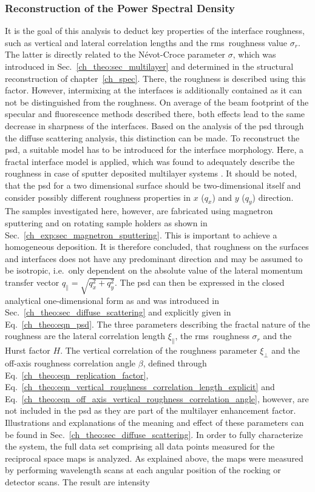\subsubsection{Reconstruction of the Power Spectral Density}
It is the goal of this analysis to deduct key properties of the interface roughness, such as vertical and lateral correlation lengths and the \gls{rms}~roughness value $\sigma_r$. The latter is directly related to the N\'{e}vot-Croce parameter $\sigma$, which was introduced in Sec.~\ref{ch_theo:sec_multilayer} and determined in the structural reconstruction of chapter~\ref{ch_spec}. There, the roughness is described using this factor. However, intermixing at the interfaces is additionally contained as it can not be distinguished from the roughness. On average of the beam footprint of the specular and fluorescence methods described there, both effects lead to the same decrease in sharpness of the interfaces. Based on the analysis of the \gls{psd} through the diffuse scattering analysis, this distinction can be made. To reconstruct the \gls{psd}, a suitable model has to be introduced for the interface morphology. Here, a fractal interface model is applied, which was found to adequately describe the roughness in case of sputter deposited multilayer systems \cite{de_boer_x-ray_1995, de_boer_x-ray_1996, sinha_x-ray_1988}. It should be noted, that the \gls{psd} for a two dimensional surface should be two-dimensional itself and consider possibly different roughness properties in $x$ ($q_x$) and $y$ ($q_y$) direction. The samples investigated here, however, are fabricated using magnetron sputtering and on rotating sample holders as shown in Sec.~\ref{ch_exp:sec_magnetron_sputtering}. This is important to achieve a homogeneous deposition. It is therefore concluded, that roughness on the surfaces and interfaces does not have any predominant direction and may be assumed to be isotropic, i.e.~only dependent on the absolute value of the lateral momentum transfer vector $q_\parallel = \sqrt{q_x^2+q_y^2}$. The \gls{psd} can then be expressed in the closed analytical one-dimensional form as and was introduced in Sec.~\ref{ch_theo:sec_diffuse_scattering} and explicitly given in Eq.~\eqref{ch_theo:eqn_psd}. The three parameters describing the fractal nature of the roughness are the lateral correlation length $\xi_\parallel$, the \gls{rms}~roughness $\sigma_r$ and the Hurst factor $H$. The vertical correlation of the roughness parameter $\xi_\perp$ and the off-axis roughness correlation angle $\beta$, defined through Eq.~\eqref{ch_theo:eqn_replication_factor}, Eq.~\eqref{ch_theo:eqn_vertical_roughness_correlation_length_explicit} and Eq.~\eqref{ch_theo:eqn_off_axis_vertical_roughness_correlation_angle}, however, are not included in the \gls{psd} as they are part of the multilayer enhancement factor. Illustrations and explanations of the meaning and effect of these parameters can be found in Sec.~\ref{ch_theo:sec_diffuse_scattering}. In order to fully characterize the system, the full data set comprising all data points measured for the reciprocal space maps is analyzed. As explained above, the maps were measured by performing wavelength scans at each angular position of the rocking or detector scans. The result are intensity 